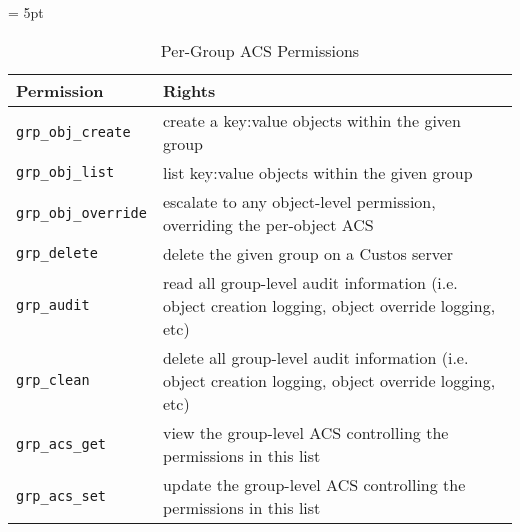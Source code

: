 \begin{table}[!tbh]
  \vspace{1ex}
  \begin{center}
    \tabulinesep = 5pt
    \begin{tabu} to \textwidth
      { | X[1,l,m]
        | X[4,l,m]
        | }
      \hline
      \textbf{Permission}
      & \textbf{Rights}
      \\ \hline
      \texttt{grp\_obj\_create}
      & create a key:value objects within the given group
      \\ \hline
      \texttt{grp\_obj\_list}
      & list key:value objects within the given group
      \\ \hline
      \texttt{grp\_obj\_override}
      & escalate to any object-level permission, overriding the per-object ACS
      \\ \hline
      \texttt{grp\_delete}
      & delete the given group on a Custos server
      \\ \hline
      \texttt{grp\_audit}
      & read all group-level audit information
      \newline
      (i.e. object creation logging, object override logging, etc)
      \\ \hline
      \texttt{grp\_clean}
      & delete all group-level audit information
      \newline
      (i.e. object creation logging, object override logging, etc)
      \\ \hline
      \texttt{grp\_acs\_get}
      & view the group-level ACS controlling the permissions in this list
      \\ \hline
      \texttt{grp\_acs\_set}
      & update the group-level ACS controlling the permissions in this list
      \\ \hline
    \end{tabu}
  \end{center}
  \caption{Per-Group ACS Permissions}
  \label{tab:permissions-group}
\end{table}

